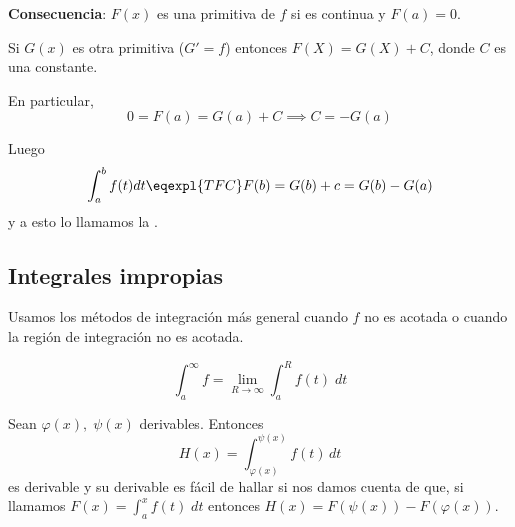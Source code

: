 \documentclass[palatino, nochap]{apuntes}
\begin{document}
{\bf Consecuencia}: $F(x)$ es una primitiva de $f$ si es continua y $F(a)=0$.

Si $G(x)$ es otra primitiva ($G' = f$) entonces $F(X) = G(X) + C$, donde $C$ es una constante.

En particular, \[ 0 = F(a) = G(a) + C \implies C = -G(a) \]

Luego \[\int_a^b f(t) dt \eqexpl{TFC} F(b) = G(b) + c = G(b) - G(a)\] y a esto lo llamamos la .


\subsection{Integrales impropias}

Usamos los métodos de integración más general cuando $f$ no es acotada o cuando la región de integración no es acotada.

\[ \int_a^\infty f = \lim_{R\to\infty}\int_a^R f(t)\;dt \]

Sean $\varphi(x),\; \psi(x)$ derivables. Entonces
\[H(x)=\int_{\varphi(x)}^{\psi(x)}f(t)\,dt \] es derivable y su derivable es fácil de hallar si nos damos cuenta de que, si llamamos $F(x)=\int_a^xf(t)\; dt$ entonces $H(x) = F(\psi(x))-F(\varphi(x))$.
\newpage
\printindex
\end{document}
